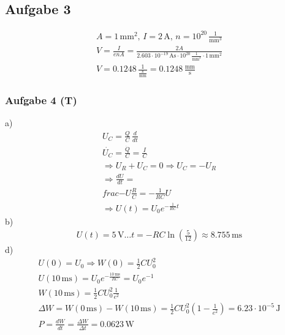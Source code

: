 \documentclass{article}
\begin{document}
\subsection*{Aufgabe 3}
\begin{eqnarray*}
    A=1\,\mathrm{mm}^2,\,I=2\,\mathrm{A},\,n=10^{20}\,\mathrm{\frac{1}{mm^3}}\\
    V=\frac{I}{enA}=\frac{2A}{2.603\cdot 10^{-19}\,\mathrm{As}\cdot10^{20}\,\mathrm{\frac{1}{mm^3}}\cdot 1\,\mathrm{mm^2}}\\
    V=0.1248\,\mathrm{\frac{1}{\frac{s}{mm}}} = 0.1248\,\mathrm{\frac{mm}{s}}
\end{eqnarray*}

\subsubsection*{Aufgabe 4 (T)}
a)\begin{eqnarray*}
    U_C=\frac{Q}{C}\,\frac{d}{dt}\\
    \dot{U_C} = \frac{\dot{Q}}{C} = \frac{I}{C}\\
    \Rightarrow U_R + U_C = 0 \Rightarrow U_C = -U_R\\
    \Rightarrow \frac{dU}{dt} = \\frac{-U}{\frac{R}{C}} = -\frac{1}{RC}U\\
    \Rightarrow U(t) = U_0e^{-\frac{1}{RC}t}
\end{eqnarray*}
b)\begin{eqnarray*}
    U(t)=5\,\mathrm{V}\dots t=-RC\ln\left(\frac{5}{12}\right)\approx 8.755\,\mathrm{ms}
\end{eqnarray*}
d)\begin{eqnarray*}
    U(0)=U_0 \Rightarrow W(0)=\frac{1}{2}CU_0^2\\
    U(10\,\mathrm{ms})=U_0e^{-\frac{10\,\mathrm{ms}}{RC}} = U_0e^{-1}\\
    W(10\,\mathrm{ms})=\frac{1}{2}CU_0^2\frac{1}{e^2}\\
    \Delta W = W (0\,\mathrm{ms}) - W(10\,\mathrm{ms}) = \frac{1}{2}CU_0^2\left(1-\frac{1}{e^2}\right)=6.23\cdot 10^{-5}\,\mathrm{J}\\
    P=\frac{dW}{dt}=\frac{\Delta W}{\Delta t} = 0.0623\,\mathrm{W}
\end{eqnarray*}
\end{document}
